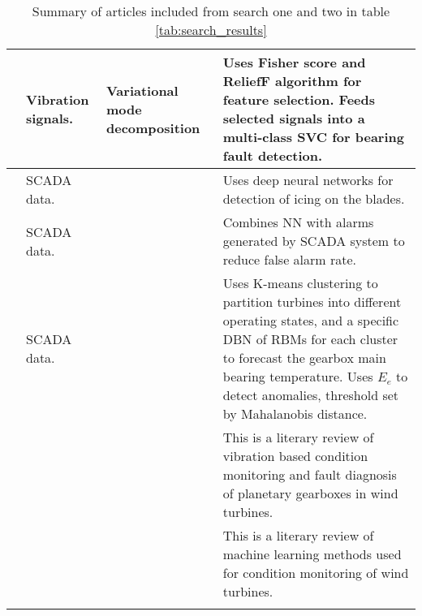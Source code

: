 \begin{longtable}{p{}p{}p{}p{}}
    \cite{roller_bearings_cm_fisher_score_and_permutation_entropy} & Vibration signals. & Variational mode decomposition & Uses Fisher score and ReliefF algorithm for feature selection. Feeds selected signals into a multi-class SVC for bearing fault detection. \\ \hline
    \cite{deep_learning_for_imbalanced_class_detection_bearing_cm} & SCADA data. & & Uses deep neural networks for detection of icing on the blades. \\ \hline
    \cite{reliability_analysis_detecting_FA_NN_wt} & SCADA data. & & Combines NN with alarms generated by SCADA system to reduce false alarm rate. \\ \hline
    \cite{DBN_chicken_swarm_optim} & SCADA data. & & Uses K-means clustering to partition turbines into different operating states, and a specific DBN of RBMs for each cluster to forecast the gearbox main bearing temperature. Uses $E_e$ to detect anomalies, threshold set by Mahalanobis distance. \\ \hline
    \cite{vibration_fault_diagnosis_wt_planetary_gearbox} & & & This is a literary review of vibration based condition monitoring and fault diagnosis of planetary gearboxes in wind turbines. \\ \hline
    \cite{ml_for_wt_cond_monit_rev} & & & This is a literary review of machine learning methods used for condition monitoring of wind turbines. \\ \hline
    \hline
    \caption{Summary of articles included from search one and two in table \ref{tab:search_results}}
    \label{tab:machine_learning_wt_cm_summary}
\end{longtable}